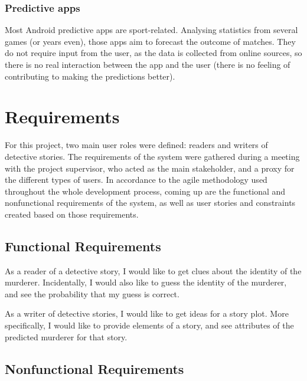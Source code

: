 \documentclass{mproj}
\begin{document}
\subsection{Predictive apps}

Most Android predictive apps are sport-related. Analysing statistics from several games (or years even), those apps aim to forecast the outcome of matches. 
They do not require input from the user, as the data is collected from online sources, so there is no real interaction between the app and the user (there is no feeling of contributing to making the predictions better).


\chapter{Requirements}

For this project, two main user roles were defined: readers and writers of detective stories. The requirements of the system were gathered during a meeting with the project supervisor, who acted as the main stakeholder, and a proxy for the different types of users. 
In accordance to the agile methodology used throughout the whole development process, coming up are the functional and nonfunctional requirements of the system, as well as user stories and constraints created based on those requirements.


\section{Functional Requirements}
	
As a reader of a detective story, I would like to get clues about the identity of the murderer. Incidentally, I would also like to guess the identity of the murderer, and see the probability that my guess is correct. \par

As a writer of detective stories, I would like to get ideas for a story plot. More specifically, I would like to provide elements of a story, and see attributes of the predicted murderer for that story.\par

\section{Nonfunctional Requirements}
	
\end{document}
